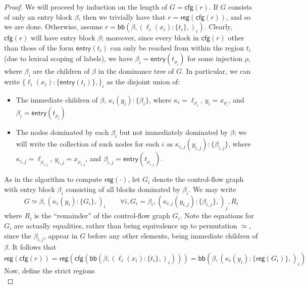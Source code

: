 \documentclass[acmsmall,screen,review]{acmart}
\newcommand{\ms}[1]{\ensuremath{\mathsf{#1}}}
\newcommand{\lto}{:}
\newcommand{\wbranch}[3]{#1(#2) \lto \{#3\}}
\newcommand{\toentry}[1]{\ms{entry}(#1)}
\newcommand{\tocfg}[1]{\ms{cfg}(#1)}
\newcommand{\adddom}[2]{\ms{bb}(#1, #2)}
\newcommand{\toreg}[1]{\ms{reg}(#1)}
\begin{document}
\begin{proof}
  We will proceed by induction on the length of $G = \tocfg{r}$. If $G$ consists of only an entry
  block $\beta$, then we trivially have that $r = \toreg{\tocfg{r}}$, and so we are done. Otherwise,
  assume $r = \adddom{\beta}{(\wbranch{\ell_i}{x_i}{t_i},)_i}$. Clearly, $\tocfg{r}$ will have entry
  block $\beta$; moreover, since every block in $\tocfg{r}$ other than those of the form
  $\toentry{t_i}$ can only be reached from within the region $t_i$ (due to lexical scoping of
  labels), we have $\beta_i = \toentry{t_{\rho_i}}$ for some injection $\rho$, where $\beta_i$ are
  the children of $\beta$ in the dominance tree of $G$. In particular, we can write
  $\{\wbranch{\ell_i}{x_i}{\toentry{t_i}},\}_i$ as the disjoint union of:
  \begin{itemize}
    \item The immediate children of $\beta$, $\wbranch{\kappa_i}{y_i}{\beta_i}$, where 
      $\kappa_i = \ell_{\rho_i}$, $y_i = x_{\rho_i}$, and $\beta_i = \toentry{t_{\rho_i}}$
    \item The nodes dominated by each $\beta_i$ but not immediately dominated by $\beta$; we will
    write the collection of such nodes for each $i$ as $\wbranch{\kappa_{i, j}}{y_{i, j}}{\beta_{i,
    j}}$, where $\kappa_{i, j} = \ell_{\rho_{i, j}}$, $y_{i, j} = x_{\rho_{i, j}}$, and $\beta_{i,
    j} = \toentry{t_{\rho_{i, j}}}$.
  \end{itemize}
  As in the algorithm to compute $\toreg{\cdot}$, let $G_i$ denote the control-flow graph with 
  entry block $\beta_i$ consisting of all blocks dominated by $\beta_i$. We may write
  \begin{equation}
    G \simeq \beta, (\wbranch{\kappa_i}{y_i}{G_i},)_i \qquad
    \forall i, G_i = \beta_i, (\wbranch{\kappa_{i, j}}{y_{i, j}}{\beta_{i, j}},)_j, R_i
  \end{equation}
  where $R_i$ is the ``remainder'' of the control-flow graph $G_i$. Note the equations for $G_i$ are
  actually equalities, rather than being equivalence up to permutation $\simeq$, since the
  $\beta_{i, j}$, appear in $G$ before any other elements, being immediate children of $\beta$. It
  follows that
  \begin{equation}
    \toreg{\tocfg{r}}
    = \toreg{\tocfg{\adddom{\beta}{(\wbranch{\ell_i}{x_i}{t_i},)_i}}}
    = \adddom{\beta}{(\wbranch{\kappa_i}{y_i}{\toreg{G_i}},)_i}
  \end{equation}
  Now, define the strict regions
  \begin{equation}

\end{equation}
\end{proof}
\end{document}
